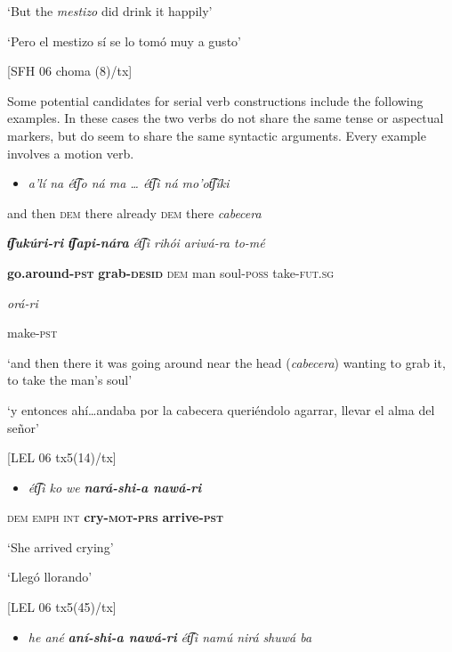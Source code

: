     ‘But the \textit{mestizo} did drink it happily’

    ‘Pero el mestizo sí se lo tomó muy a gusto’

    [SFH 06 choma (8)/tx]

Some potential candidates for serial verb constructions include the following examples. In these cases the two verbs do not share the same tense or aspectual markers, but do seem to share the same syntactic arguments. Every example involves a motion verb.

\begin{itemize}
\item \textit{a’lí   na      ét͡ʃo   ná       ma …     ét͡ʃi   ná     mo’ot͡ʃíki}      
\end{itemize}

and   then   \textsc{dem} there   already   \textsc{dem} there   \textit{cabecera}   

 \textbf{\textit{t͡ʃukúri-ri     t͡ʃapi-nára}} \textit{ét͡ʃi  rihói   ariwá-ra   to-mé} 

\textbf{go.around-\textsc{pst}} \textbf{grab-\textsc{desid}}  \textsc{dem} man   soul-\textsc{poss} take-\textsc{fut.sg} 

\textit{orá-ri}

make-\textsc{pst}

‘and then there it was going around near the head (\textit{cabecera}) wanting to grab it, to take the man’s soul’

  ‘y entonces ahí…andaba por la cabecera queriéndolo agarrar, llevar el alma del señor’

  [LEL 06 tx5(14)/tx]

\begin{itemize}
\item \textit{ét͡ʃi   ko   we} \textbf{\textit{nará-shi-a   nawá-ri}} 
\end{itemize}

  \textsc{dem   emph   int}   \textbf{cry-\textsc{mot-prs} }\textbf{arrive-\textsc{pst}}

  ‘She arrived crying’

  ‘Llegó llorando’

  [LEL 06 tx5(45)/tx]

\begin{itemize}
\item \textit{he   ané} \textbf{\textit{aní-shi-a         nawá-ri}} \textit{ét͡ʃi    namú nirá} \textit{shuwá         ba}  
\end{itemize}

